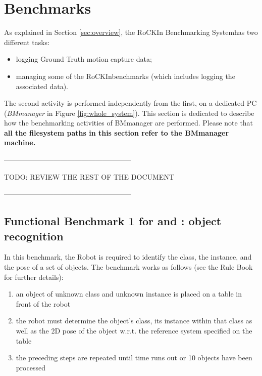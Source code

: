 \documentclass[a4paper]{article}
\newcommand{\ro}{RoCKIn}
\newcommand{\rbs}{RoCKIn Benchmarking System}
\begin{document}
\clearpage


\section{Benchmarks}
\label{sec:benchmarks}

As explained in Section \ref{sec:overview}, the \rbs has two different tasks:
\begin{itemize}
\item logging Ground Truth motion capture data;
\item managing some of the \ro benchmarks (which includes logging the associated data).
\end{itemize}

The second activity is performed independently from the first, on a dedicated PC (\textit{BMmanager} in Figure \ref{fig:whole_system}). This section is dedicated to describe how the benchmarking activities of BMmanager are performed. Please note that \textbf{all the filesystem paths in this section refer to the BMmanager machine.}


------------------------------------------------------

TODO: REVIEW THE REST OF THE DOCUMENT

------------------------------------------------------


\subsection{Functional Benchmark 1 for \ro@Home and \ro@Work: object recognition}
\label{fbm1h+w}
In this benchmark, the Robot is required to identify the class, the instance, and the pose of a set of objects.
The benchmark works as follows (see the Rule Book for further details):

\begin{enumerate}
  \item an object of unknown class and unknown instance is placed on a table in front of the robot
  \item the robot must determine the object’s class, its instance within that class as well as the 2D pose of the object w.r.t. the reference system specified on the table
  \item the preceding steps are repeated until time runs out or 10 objects have been processed
\end{enumerate}
\end{document}
